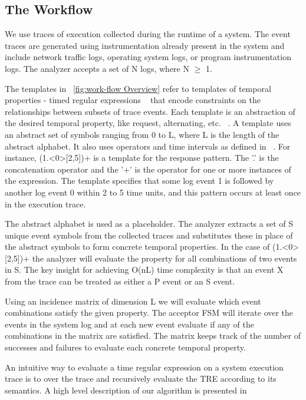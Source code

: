 \documentclass[]{sigplanconf}
\begin{document}
\subsection{The Workflow} \label{the_workflow}

We use traces of execution collected during the runtime of a system. The event traces are generated using instrumentation already present in the system and include network traffic logs, operating system logs, or program instrumentation logs. The analyzer accepts a set of N logs, where N $\ge$ 1.

The templates in ~\ref{fig:work-flow Overview} refer to templates of temporal properties - timed regular expressions ~\cite{timedregex} that encode constraints on the relationships between subsets of trace events. Each template is an abstraction of the desired temporal property, like request, alternating, etc. ~\cite{evans1}. A template uses an abstract set of symbols ranging from 0 to L, where L is the length of the abstract alphabet. It also uses operators and time intervals as defined in ~\cite{timedregex}. For instance, (1.\textless0\textgreater[2,5])+ is a template for the response pattern. The '.' is the concatenation operator and the '+' is the operator for one or more instances of the expression.  The template specifies that some log event 1 is followed by another log event 0 within 2 to 5 time units, and this pattern occurs at least once in the execution trace.

The abstract alphabet is used as a placeholder. The analyzer extracts a set of S unique event symbols from the collected traces and substitutes these in place of the abstract symbols to form concrete temporal properties. In the case of (1.\textless0\textgreater[2,5])+ the analyzer will evaluate the property for all combinations of two events in S. The key insight for achieving O(nL) time complexity is that an event X from the trace can be treated as either a P event or an S event.

Using an incidence matrix of dimension L we will evaluate which event combinations satisfy the given property. The acceptor FSM will iterate over the events in the system log and at each new event evaluate if any of the combinations in the matrix are satisfied. The matrix keeps track of the number of successes and failures to evaluate each concrete temporal property.


An intuitive way to evaluate a time regular expression on a system execution trace is to over the trace and recursively evaluate the TRE according to its semantics. A high level description of our algorithm is presented in
\end{document}
